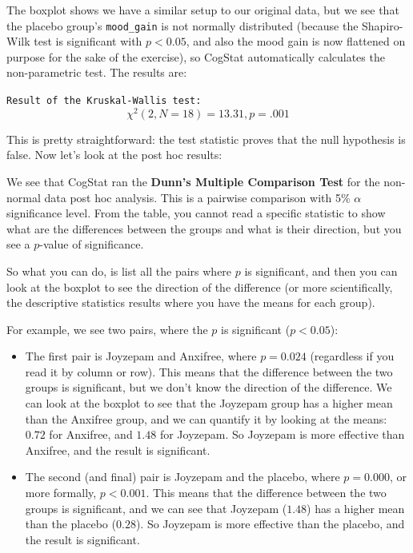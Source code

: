 \documentclass[
]{book}
\providecommand{\tightlist}{%
  \setlength{\itemsep}{0pt}\setlength{\parskip}{0pt}}
\theoremstyle{definition}
\theoremstyle{definition}
\theoremstyle{definition}
\theoremstyle{definition}
\theoremstyle{remark}
\begin{document}
The boxplot shows we have a similar setup to our original data, but we see that the placebo group's \texttt{mood\_gain} is not normally distributed (because the Shapiro-Wilk test is significant with \(p < 0.05\), and also the mood gain is now flattened on purpose for the sake of the exercise), so CogStat automatically calculates the non-parametric test. The results are:

\texttt{Result\ of\ the\ Kruskal-Wallis\ test:}
\[
\chi^2(2, N = 18) = 13.31, p = .001
\]

This is pretty straightforward: the test statistic proves that the null hypothesis is false. Now let's look at the post hoc results:

We see that CogStat ran the \textbf{Dunn's Multiple Comparison Test} for the non-normal data post hoc analysis. This is a pairwise comparison with 5\% \(\alpha\) significance level. From the table, you cannot read a specific statistic to show what are the differences between the groups and what is their direction, but you see a \(p\)-value of significance.

So what you can do, is list all the pairs where \(p\) is significant, and then you can look at the boxplot to see the direction of the difference (or more scientifically, the descriptive statistics results where you have the means for each group).

For example, we see two pairs, where the \(p\) is significant (\(p < 0.05\)):

\begin{itemize}
\tightlist
\item
  The first pair is Joyzepam and Anxifree, where \(p = 0.024\) (regardless if you read it by column or row). This means that the difference between the two groups is significant, but we don't know the direction of the difference. We can look at the boxplot to see that the Joyzepam group has a higher mean than the Anxifree group, and we can quantify it by looking at the means: \(0.72\) for Anxifree, and \(1.48\) for Joyzepam. So Joyzepam is more effective than Anxifree, and the result is significant.
\item
  The second (and final) pair is Joyzepam and the placebo, where \(p = 0.000\), or more formally, \(p < 0.001\). This means that the difference between the two groups is significant, and we can see that Joyzepam (\(1.48\)) has a higher mean than the placebo (\(0.28\)). So Joyzepam is more effective than the placebo, and the result is significant.
\end{itemize}
\end{document}
